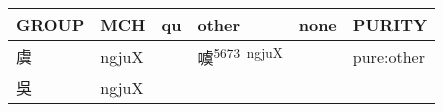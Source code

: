 \documentclass[14pt,a4paper]{scrartcl}
\begin{document}
\begin{longtable}[c]{@{}llllll@{}}
\toprule
\begin{minipage}[b]{0.14\columnwidth}\raggedright\strut
GROUP
\strut\end{minipage} &
\begin{minipage}[b]{0.14\columnwidth}\raggedright\strut
MCH
\strut\end{minipage} &
\begin{minipage}[b]{0.14\columnwidth}\raggedright\strut
qu
\strut\end{minipage} &
\begin{minipage}[b]{0.14\columnwidth}\raggedright\strut
other
\strut\end{minipage} &
\begin{minipage}[b]{0.14\columnwidth}\raggedright\strut
none
\strut\end{minipage} &
\begin{minipage}[b]{0.14\columnwidth}\raggedright\strut
PURITY
\strut\end{minipage}\tabularnewline
\midrule
\endhead
\begin{minipage}[t]{0.14\columnwidth}\raggedright\strut
虞
\strut\end{minipage} &
\begin{minipage}[t]{0.14\columnwidth}\raggedright\strut
ngjuX
\strut\end{minipage} &
\begin{minipage}[t]{0.14\columnwidth}\raggedright\strut
\strut\end{minipage} &
\begin{minipage}[t]{0.14\columnwidth}\raggedright\strut
噳\textsuperscript{5673~ngjuX}
\strut\end{minipage} &
\begin{minipage}[t]{0.14\columnwidth}\raggedright\strut
\strut\end{minipage} &
\begin{minipage}[t]{0.14\columnwidth}\raggedright\strut
pure:other
\strut\end{minipage}\tabularnewline
\begin{minipage}[t]{0.14\columnwidth}\raggedright\strut
吳
\strut\end{minipage} &
\begin{minipage}[t]{0.14\columnwidth}\raggedright\strut
ngjuX
\strut\end{minipage} &
\begin{minipage}[t]{0.14\columnwidth}\raggedright\strut
\strut\end{minipage} &

\end{longtable}
\end{document}
